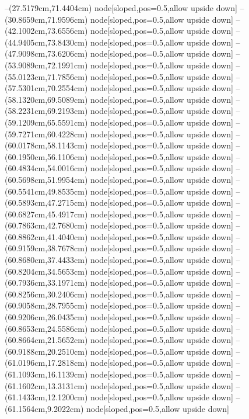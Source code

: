 --(27.5179cm,71.4404cm) node[sloped,pos=0.5,allow upside down]{\arrowIn}
--(30.8659cm,71.9596cm) node[sloped,pos=0.5,allow upside down]{\ArrowIn}
--(42.1002cm,73.6556cm) node[sloped,pos=0.5,allow upside down]{\ArrowIn}
--(44.9405cm,73.8430cm) node[sloped,pos=0.5,allow upside down]{\ArrowIn}
--(47.9098cm,73.6206cm) node[sloped,pos=0.5,allow upside down]{\ArrowIn}
--(53.9089cm,72.1991cm) node[sloped,pos=0.5,allow upside down]{\ArrowIn}
--(55.0123cm,71.7856cm) node[sloped,pos=0.5,allow upside down]{\ArrowIn}
--(57.5301cm,70.2554cm) node[sloped,pos=0.5,allow upside down]{\ArrowIn}
--(58.1320cm,69.5089cm) node[sloped,pos=0.5,allow upside down]{\arrowIn}
--(58.2231cm,69.2193cm) node[sloped,pos=0.5,allow upside down]{\arrowIn}
--(59.1209cm,65.5591cm) node[sloped,pos=0.5,allow upside down]{\ArrowIn}
--(59.7271cm,60.4228cm) node[sloped,pos=0.5,allow upside down]{\ArrowIn}
--(60.0178cm,58.1143cm) node[sloped,pos=0.5,allow upside down]{\ArrowIn}
--(60.1950cm,56.1106cm) node[sloped,pos=0.5,allow upside down]{\ArrowIn}
--(60.4834cm,54.0016cm) node[sloped,pos=0.5,allow upside down]{\ArrowIn}
--(60.5698cm,51.9954cm) node[sloped,pos=0.5,allow upside down]{\ArrowIn}
--(60.5541cm,49.8535cm) node[sloped,pos=0.5,allow upside down]{\ArrowIn}
--(60.5893cm,47.2715cm) node[sloped,pos=0.5,allow upside down]{\ArrowIn}
--(60.6827cm,45.4917cm) node[sloped,pos=0.5,allow upside down]{\ArrowIn}
--(60.7863cm,42.7680cm) node[sloped,pos=0.5,allow upside down]{\ArrowIn}
--(60.8862cm,41.4040cm) node[sloped,pos=0.5,allow upside down]{\ArrowIn}
--(60.9159cm,38.7678cm) node[sloped,pos=0.5,allow upside down]{\ArrowIn}
--(60.8680cm,37.4433cm) node[sloped,pos=0.5,allow upside down]{\ArrowIn}
--(60.8204cm,34.5653cm) node[sloped,pos=0.5,allow upside down]{\ArrowIn}
--(60.7936cm,33.1971cm) node[sloped,pos=0.5,allow upside down]{\ArrowIn}
--(60.8256cm,30.2406cm) node[sloped,pos=0.5,allow upside down]{\ArrowIn}
--(60.9058cm,28.7955cm) node[sloped,pos=0.5,allow upside down]{\ArrowIn}
--(60.9206cm,26.0435cm) node[sloped,pos=0.5,allow upside down]{\ArrowIn}
--(60.8653cm,24.5586cm) node[sloped,pos=0.5,allow upside down]{\ArrowIn}
--(60.8664cm,21.5652cm) node[sloped,pos=0.5,allow upside down]{\ArrowIn}
--(60.9188cm,20.2510cm) node[sloped,pos=0.5,allow upside down]{\ArrowIn}
--(61.0196cm,17.2818cm) node[sloped,pos=0.5,allow upside down]{\ArrowIn}
--(61.1093cm,16.1139cm) node[sloped,pos=0.5,allow upside down]{\ArrowIn}
--(61.1602cm,13.3131cm) node[sloped,pos=0.5,allow upside down]{\ArrowIn}
--(61.1433cm,12.1200cm) node[sloped,pos=0.5,allow upside down]{\ArrowIn}
--(61.1564cm,9.2022cm) node[sloped,pos=0.5,allow upside down]{\ArrowIn}
